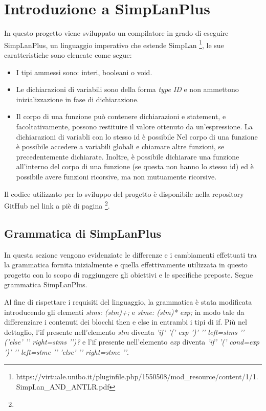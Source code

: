 \section{Introduzione a SimpLanPlus}
In questo progetto viene sviluppato un compilatore in grado di eseguire SimpLanPlus, un linguaggio imperativo che estende SimpLan \footnote{https://virtuale.unibo.it/pluginfile.php/1550508/mod\_resource/content/1/1.SimpLan\_AND\_ANTLR.pdf}, le sue caratteristiche sono elencate come segue:
\begin{itemize}
\item I tipi ammessi sono: interi, booleani o void.
\item Le dichiarazioni di variabili sono della forma  \textit{type ID} e non ammettono inizializzazione in fase di dichiarazione.
\item Il corpo di una funzione può contenere dichiarazioni e statement, e facoltativamente, possono restituire il valore ottenuto da un'espressione. La dichiarazioni di variabli con lo stesso id è possibile Nel corpo di una funzione è possibile accedere a variabili globali e chiamare altre funzioni, se precedentemente dichiarate. Inoltre, è possibile dichiarare una funzione all'interno del corpo di una funzione (se questa non hanno lo stesso id) ed è possibile avere funzioni ricorsive, ma non mutuamente ricorsive.
\end{itemize}

Il codice utilizzato per lo sviluppo del progetto è disponibile nella repository GitHub nel link a piè di pagina \footnote{}.

\subsection{Grammatica di SimpLanPlus}
In questa sezione vengono evidenziate le differenze e i cambiamenti effettuati tra la grammatica fornita inizialmente e quella effettivamente utilizzata in questo progetto con lo scopo di raggiungere gli obiettivi e le specifiche preposte. Segue grammatica SimpLanPlus.

Al fine di rispettare i requisiti del linguaggio, la grammatica è stata modificata introducendo gli elementi \textit{stms: (stm)+;} e \textit{stme: (stm)* exp;} in modo tale da differenziare i contenuti dei blocchi then e else in entrambi i tipi di if. Più nel dettaglio, l'if presente nell'elemento \textit{stm} diventa \textit{'if' '(' exp ')' '{' left=stms '}' ('else' '{' right=stms '}')?} e l'if presente nell'elemento \textit{exp} diventa \textit{'if' '(' cond=exp ')' '{' left=stme '}' 'else' '{' right=stme '}'}.

